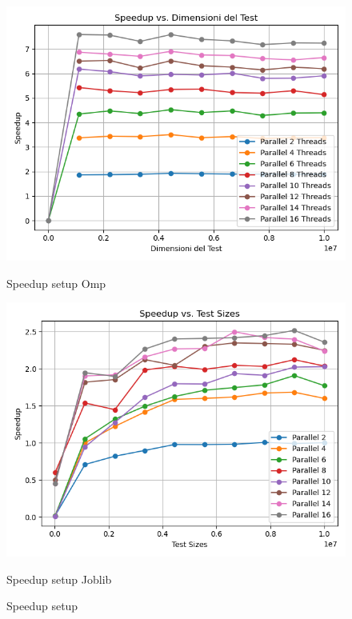 \documentclass[11pt]{article}
\begin{document}
    \begin{figure}[H]
        \centering
        \includegraphics[width=\linewidth]{omp/010/setup_speedup_plot}
            \caption{Speedup setup Omp}\label{fig:010-setup_speedup_omp}
        \endminipage\hfill
        \includegraphics[width=\linewidth]{joblib/010/setup_speedup_plot}
            \caption{Speedup setup Joblib}\label{fig:010-setup_speedup_joblib}
        \endminipage\hfill
        \caption{Speedup setup}
    \end{figure}
\end{document}
